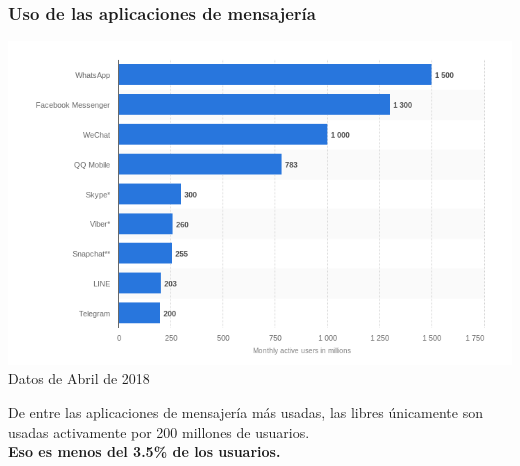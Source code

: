 \begin{frame}
    
    \frametitle{Uso de las aplicaciones de mensajería}
    \includegraphics[width=\textwidth]{images/messaging-chart.png}
    \vfill
    \tiny{Datos de Abril de 2018}

\end{frame}

\begin{frame}
    \centering
    \large{De entre las aplicaciones de mensajería más usadas, las libres únicamente son usadas activamente por 200 millones de usuarios. \\ \textbf{Eso es menos del 3.5\% de los usuarios.}}
\end{frame}

